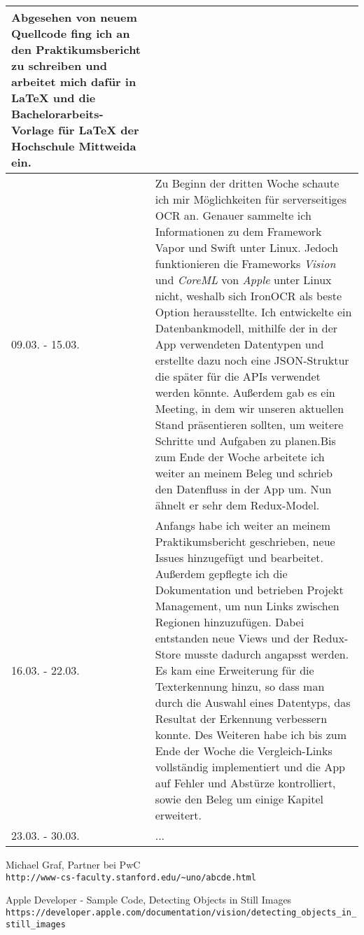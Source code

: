\documentclass[nomenclature, 150]{HSMW-Thesis}
\begin{document}
\begin{longtable}[h!]{ p{4em} | p{356pt} }
			Abgesehen von neuem Quellcode fing ich an den Praktikumsbericht zu schreiben und arbeitet mich dafür in \LaTeX \xspace und die Bachelorarbeits-Vorlage für \LaTeX \xspace der Hochschule Mittweida ein.
			\\ \hline
	 	09.03. - 15.03. &
	 		Zu Beginn der dritten Woche schaute ich mir Möglichkeiten für serverseitiges OCR an. Genauer sammelte ich Informationen zu dem Framework Vapor und Swift unter Linux. Jedoch funktionieren die Frameworks \textit{Vision} und \textit{CoreML} von \textit{Apple} unter Linux nicht, weshalb sich IronOCR als beste Option herausstellte. Ich entwickelte ein Datenbankmodell, mithilfe der in der App verwendeten Datentypen und erstellte dazu noch eine JSON-Struktur die später für die APIs verwendet werden könnte. Außerdem gab es ein Meeting, in dem wir unseren aktuellen Stand präsentieren sollten, um weitere Schritte und Aufgaben zu planen.Bis zum Ende der Woche arbeitete ich weiter an meinem Beleg und schrieb den Datenfluss in der App um. Nun ähnelt er sehr dem Redux-Model.
	 		\\ \hline
	 	16.03. - 22.03. & 
	 		Anfangs habe ich weiter an meinem Praktikumsbericht geschrieben, neue Issues hinzugefügt und bearbeitet. Außerdem gepflegte ich die Dokumentation und betrieben Projekt Management, um nun Links zwischen Regionen hinzuzufügen. Dabei entstanden neue Views und der Redux-Store musste dadurch angapsst werden. Es kam eine Erweiterung für die Texterkennung hinzu, so dass man durch die Auswahl eines Datentyps, das Resultat der Erkennung verbessern konnte. Des Weiteren habe ich bis zum Ende der Woche die Vergleich-Links vollständig implementiert und die App auf Fehler und Abstürze kontrolliert, sowie den Beleg um einige Kapitel erweitert.
	 		\\ \hline
	 	23.03. - 30.03. &
	 		...
	 		\\ \hline
	\end{longtable}
		
		
\begin{thebibliography}{99}
		Michael Graf, Partner bei PwC
		\\\texttt{http://www-cs-faculty.stanford.edu/\~{}uno/abcde.html}
		
		Apple Developer - Sample Code, Detecting Objects in Still Images
		\\\texttt{https://developer.apple.com/documentation/vision/detecting\_objects\_in\_still\_images}		
		
\end{thebibliography}
\end{document}
